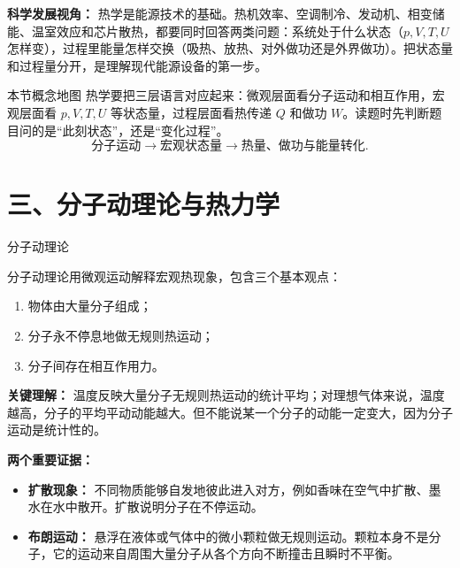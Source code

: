 \textbf{科学发展视角：} 热学是能源技术的基础。热机效率、空调制冷、发动机、相变储能、温室效应和芯片散热，都要同时回答两类问题：系统处于什么状态（$p,V,T,U$ 怎样变），过程里能量怎样交换（吸热、放热、对外做功还是外界做功）。把状态量和过程量分开，是理解现代能源设备的第一步。

\begin{learningbox}{本节概念地图}
热学要把三层语言对应起来：微观层面看分子运动和相互作用，宏观层面看 $p,V,T,U$ 等状态量，过程层面看热传递 $Q$ 和做功 $W$。读题时先判断题目问的是“此刻状态”，还是“变化过程”。
\[
\text{分子运动}\rightarrow \text{宏观状态量}\rightarrow \text{热量、做功与能量转化}.
\]
\end{learningbox}

\section*{三、分子动理论与热力学}

\begin{conceptbox}{分子动理论}

分子动理论用微观运动解释宏观热现象，包含三个基本观点：
\begin{enumerate}
  \item 物体由大量分子组成；
  \item 分子永不停息地做无规则热运动；
  \item 分子间存在相互作用力。
\end{enumerate}

\begin{center}


\label{fig:molecular-motion}
\end{center}

\textbf{关键理解：} 温度反映大量分子无规则热运动的统计平均；对理想气体来说，温度越高，分子的平均平动动能越大。但不能说某一个分子的动能一定变大，因为分子运动是统计性的。

\textbf{两个重要证据：}
\begin{itemize}
  \item \textbf{扩散现象：} 不同物质能够自发地彼此进入对方，例如香味在空气中扩散、墨水在水中散开。扩散说明分子在不停运动。
  \item \textbf{布朗运动：} 悬浮在液体或气体中的微小颗粒做无规则运动。颗粒本身不是分子，它的运动来自周围大量分子从各个方向不断撞击且瞬时不平衡。
\end{itemize}

\begin{center}


\label{fig:diffusion-brownian-motion}
\end{center}
\end{conceptbox}

